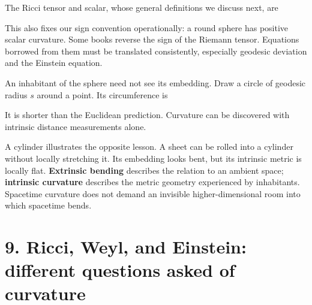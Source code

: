 \documentclass[
  11pt,
  letterpaper,
  oneside,
  openany]{scrbook}
\begin{document}
\begin{center}
\begingroup
{}
\ifdim\wd\grmathbox>\linewidth
\resizebox{\linewidth}{!}{\usebox{\grmathbox}}
\else\usebox{\grmathbox}\fi
\endgroup
\end{center}

The Ricci tensor and scalar, whose general definitions we discuss next,
are

\begin{center}
\begingroup
{}
\ifdim\wd\grmathbox>\linewidth
\resizebox{\linewidth}{!}{\usebox{\grmathbox}}
\else\usebox{\grmathbox}\fi
\endgroup
\end{center}

This also fixes our sign convention operationally: a round sphere has
positive scalar curvature. Some books reverse the sign of the Riemann
tensor. Equations borrowed from them must be translated consistently,
especially geodesic deviation and the Einstein equation.

An inhabitant of the sphere need not see its embedding. Draw a circle of
geodesic radius \(s\) around a point. Its circumference is

\begin{center}
\begingroup
{}
\ifdim\wd\grmathbox>\linewidth
\resizebox{\linewidth}{!}{\usebox{\grmathbox}}
\else\usebox{\grmathbox}\fi
\endgroup
\end{center}

It is shorter than the Euclidean prediction. Curvature can be discovered
with intrinsic distance measurements alone.

A cylinder illustrates the opposite lesson. A sheet can be rolled into a
cylinder without locally stretching it. Its embedding looks bent, but
its intrinsic metric is locally flat. \textbf{Extrinsic bending}
describes the relation to an ambient space; \textbf{intrinsic curvature}
describes the metric geometry experienced by inhabitants. Spacetime
curvature does not demand an invisible higher-dimensional room into
which spacetime bends.

\hypertarget{chapter-9}{%
\chapter{9. Ricci, Weyl, and Einstein: different questions asked of
curvature}\label{chapter-9}}
\end{document}
